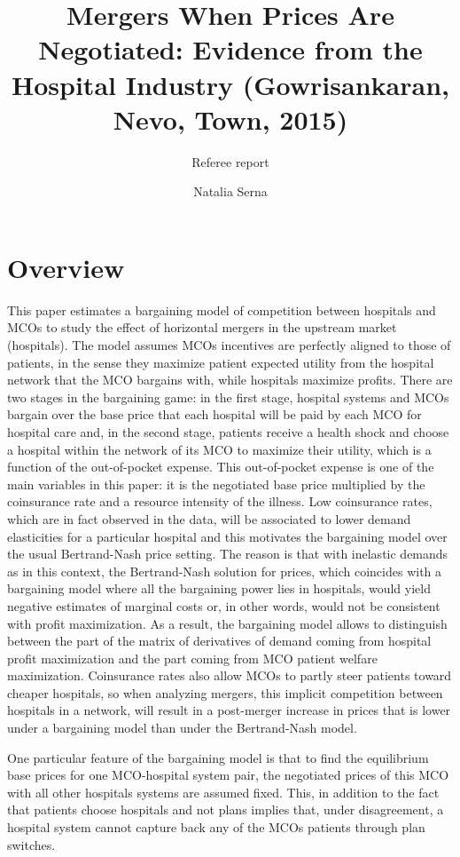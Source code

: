 \documentclass[12pt,english]{article}
\author{
Natalia Serna
   }
\title{Mergers When Prices Are Negotiated: Evidence from the Hospital Industry (Gowrisankaran, Nevo, Town, 2015)}
\subtitle{Referee report}
\date{}
\begin{document}
\maketitle


\section{Overview}

This paper estimates a bargaining model of competition between hospitals and MCOs to study the effect of horizontal mergers in the upstream market (hospitals). The model assumes MCOs incentives are perfectly aligned to those of patients, in the sense they maximize patient expected utility from the hospital network that the MCO bargains with, while hospitals maximize profits. There are two stages in the bargaining game: in the first stage, hospital systems and MCOs bargain over the base price that each hospital will be paid by each MCO for hospital care and, in the second stage, patients receive a health shock and choose a hospital within the network of its MCO to maximize their utility, which is a function of the out-of-pocket expense. This out-of-pocket expense is one of the main variables in this paper: it is the negotiated base price multiplied by the coinsurance rate and a resource intensity of the illness. Low coinsurance rates, which are in fact observed in the data, will be associated to lower demand elasticities for a particular hospital and this motivates the bargaining model over the usual Bertrand-Nash price setting. The reason is that with inelastic demands as in this context, the Bertrand-Nash solution for prices, which coincides with a bargaining model where all the bargaining power lies in hospitals, would yield negative estimates of marginal costs or, in other words, would not be consistent with profit maximization. As a result, the bargaining model allows to distinguish between the part of the matrix of derivatives of demand coming from hospital profit maximization and the part coming from MCO patient welfare maximization. Coinsurance rates also allow MCOs to partly steer patients toward cheaper hospitals, so when analyzing mergers, this implicit competition between hospitals in a network, will result in a post-merger increase in prices that is lower under a bargaining model than under the Bertrand-Nash model.

One particular feature of the bargaining model is that to find the equilibrium base prices for one MCO-hospital system pair, the negotiated prices of this MCO with all other hospitals systems are assumed fixed. This, in addition to the fact that patients choose hospitals and not plans implies that, under disagreement, a hospital system cannot capture back any of the MCOs patients through plan switches.
\end{document}
